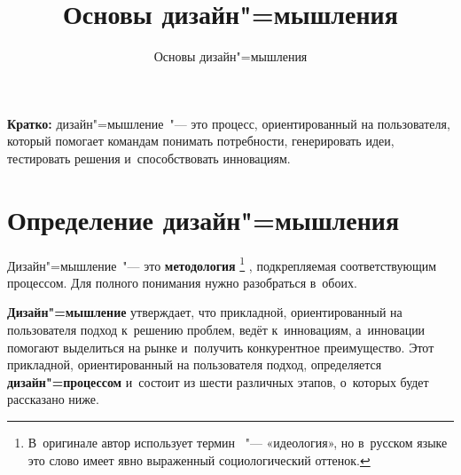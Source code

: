 \documentclass[12pt]{article}
\begin{document}
\title{Основы дизайн"=мышления}
\subtitle{Основы дизайн"=мышления}


\begin{leftbar}
	\large
	\textbf{Кратко:} дизайн"=мышление~"--- это процесс, ориентированный на пользователя, который помогает командам понимать потребности, генерировать идеи, тестировать решения и~способствовать инновациям.
\end{leftbar}

\vspace{0.8em}
{}
\vspace{-0.8em}
\begin{leftbar}
	\vspace{-12pt}
	\tableofcontents
\end{leftbar}

\section{Определение дизайн"=мышления}
Дизайн"=мышление~"--- это \textbf{методология}%
\footnote{%
	В~оригинале автор использует термин ~"---
	«идеология», но в~русском языке это слово имеет явно
	выраженный социологический оттенок.%
}%
, подкрепляемая соответствующим процессом. Для полного понимания нужно разобраться в~обоих. 

\begin{leftbar} 
	\textbf{Дизайн"=мышление} утверждает, что прикладной, ориентированный на пользователя подход к~решению проблем, ведёт к~инновациям, а~инновации помогают выделиться на рынке и~получить конкурентное преимущество. Этот прикладной, ориентированный на пользователя подход, определяется \textbf{дизайн"=процессом} и~состоит из шести различных этапов, о~которых будет рассказано ниже.
\end{leftbar}
\end{document}
